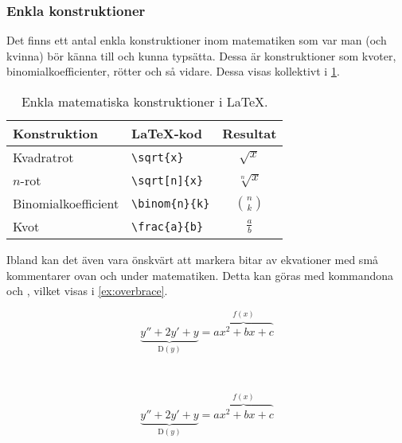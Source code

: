 \documentclass[lang=sv,ptsize=10pt,font=none,nomath,titles=bf,../../a4.tex]{subfiles}
\begin{document}
\subsubsection{Enkla konstruktioner} %
Det finns ett antal enkla konstruktioner inom matematiken som var man
(och kvinna) bör känna till och kunna typsätta. Dessa är konstruktioner
som kvoter, binomialkoefficienter, rötter och så vidare. Dessa visas
kollektivt i \cref{tab:math:enkla}.

\begin{table}[p]
	\centering
	\caption{Enkla matematiska konstruktioner i \LaTeX{}.}
	\label{tab:math:enkla}
	\begin{tabular}{llc}
		\toprule 
		Konstruktion & \LaTeX-kod & Resultat  \\
		\midrule 
		Kvadratrot & \verb|\sqrt{x}| & \(\sqrt{x}\) \\
		\(n\)-rot & \verb|\sqrt[n]{x}| & \(\sqrt[n]{x}\) \\
		Binomialkoefficient & \verb|\binom{n}{k}| & \(\binom{n}{k}\) \\
		Kvot & \verb|\frac{a}{b}| & \(\frac{a}{b}\) \\
		\bottomrule 
	\end{tabular}
\end{table}

Ibland kan det även vara önskvärt att markera bitar av ekvationer med små
kommentarer ovan och under matematiken. Detta kan göras med kommandona
 och , vilket visas i \cref{ex:overbrace}.

\begin{kod}[p]
	\centering
	\begin{minipage}{0.8\textwidth} %
		\begin{latexcode}
\begin{equation*}
\underbrace{y'' + 2y' + y}_{\mathrm{D}(y)}
= \overbrace{ax^2+bx+c}^{f(x)}
\end{equation*}
		\end{latexcode}
	\end{minipage}
	\medskip\\
	\begin{minipage}{0.8\textwidth} %
		\begin{equation*}
			\underbrace{y'' + 2y' + y}_{\mathrm{D}(y)}
			= \overbrace{ax^2+bx+c}^{f(x)}
		\end{equation*}
	\end{minipage}		
	\caption{Annotering med  och .}
	\label{ex:overbrace}
\end{kod}
\end{document}
